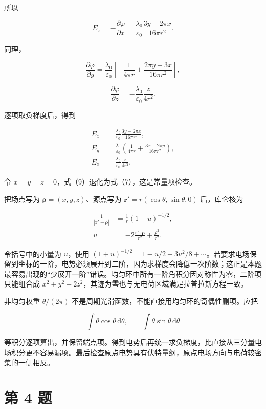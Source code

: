 \documentclass[12pt,a4paper,UTF8]{ctexart}
\begin{document}
所以

\[E_x=-\frac{\partial\varphi}{\partial x}
=\frac{\lambda_0}{\varepsilon_0}
\frac{3y-2\pi x}{16\pi r^2}.\]

同理，

\[\frac{\partial\varphi}{\partial y}
=\frac{\lambda_0}{\varepsilon_0}
\left[-\frac1{4\pi r}
+\frac{2\pi y-3x}{16\pi r^2}\right],\]

\[\frac{\partial\varphi}{\partial z}
=-\frac{\lambda_0}{\varepsilon_0}\frac{z}{4r^2}.\]

逐项取负梯度后，得到

\[\boxed{
\begin{aligned}
E_x&=\frac{\lambda_0}{\varepsilon_0}
\frac{3y-2\pi x}{16\pi r^2},\\
E_y&=\frac{\lambda_0}{\varepsilon_0}
\left(\frac1{4\pi r}+\frac{3x-2\pi y}{16\pi r^2}\right),\\
E_z&=\frac{\lambda_0}{\varepsilon_0}\frac{z}{4r^2}.
\end{aligned}
} \tag{9}\]

令 \(x=y=z=0\)，式（9）退化为式（7），这是常量项检查。

把场点写为 \(\boldsymbol\rho=(x,y,z)\)、源点写为
\(\boldsymbol r'=r(\cos\theta,\sin\theta,0)\) 后，库仑核为

\[\begin{aligned}
\frac1{|\boldsymbol r'-\boldsymbol\rho|}
&=\frac1r\left(1+u\right)^{-1/2},\\
u&=-2\frac{\boldsymbol r'\cdot\boldsymbol\rho}{r^2}
+\frac{\rho^2}{r^2}.
\end{aligned}\]

令括号中的小量为 \(u\)，使用
\((1+u)^{-1/2}=1-u/2+3u^2/8+\cdots\)。若要求电场保留到坐标的一阶，电势必须展开到二阶，因为求梯度会降低一次阶数；这正是本题最容易出现的``少展开一阶''错误。均匀环中所有一阶角积分因对称性为零，二阶项只能组合成
\(x^2+y^2-2z^2\)，其迹为零也与无电荷区域满足拉普拉斯方程一致。

非均匀权重 \(\theta/(2\pi)\)
不是周期光滑函数，不能直接用均匀环的奇偶性删项。应把

\[\int\theta\cos\theta\,\mathrm d\theta,
\qquad
\int\theta\sin\theta\,\mathrm d\theta\]

等积分逐项算出，并保留端点项。得到电势后再统一求负梯度，比直接从三分量电场积分更不容易漏项。最后检查原点电势具有伏特量纲，原点电场方向与电荷较密集的一侧相反。

\newpage

\section{第 4 题}\label{ux7b2c-4-ux9898}
\end{document}
